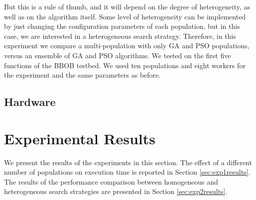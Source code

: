 \documentclass[review]{elsarticle}
\begin{document}
But this is a rule of thumb, and it will depend on the degree of heterogeneity,
as well as on the algorithm itself. Some level of heterogeneity can be
implemented by just changing the configuration parameters of each population,
but in this case, we are interested in a heterogeneous search strategy. 
Therefore, in this experiment we compare a multi-population with only GA and PSO populations,
versus an ensemble of GA and PSO algorithms. We tested on the first five functions of the
BBOB testbed. We used ten populations and eight workers for the experiment and the
same parameters as before.  

\subsection{Hardware}
\label{sec:hardware}


\section{Experimental Results} 
\label{results}

We present the results of the experiments in this section. The effect of a
different number of populations on execution time is reported in  Section
\ref{sec:exp1results}. The results of the performance comparison between homogeneous and
heterogeneous search strategies are presented in Section \ref{sec:exp2results}.     
\end{document}
